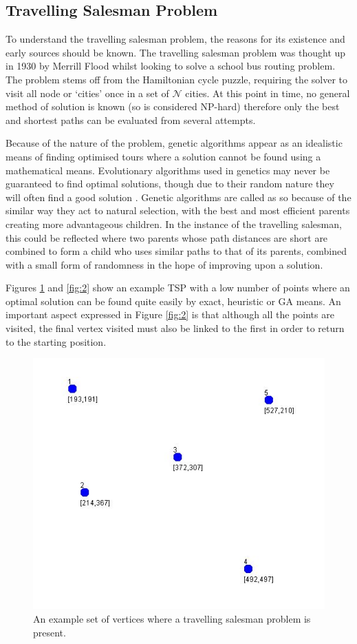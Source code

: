 \documentclass[article]{IEEEtran}
\begin{document}
\subsection{Travelling Salesman Problem}
To understand the travelling salesman problem, the reasons for its existence and early sources should be known. The travelling salesman problem was thought up in 1930 \cite{1} by Merrill Flood whilst looking to solve a school bus routing problem. The problem stems off from the Hamiltonian cycle puzzle, requiring the solver to visit all node or ‘cities’ once in a set of \( \mathcal{N} \) cities. At this point in time, no general method of solution is known \cite{2} (so is considered NP-hard) therefore only the best and shortest paths can be evaluated from several attempts. \par
Because of the nature of the problem, genetic algorithms appear as an idealistic means of finding optimised tours where a solution cannot be found using a mathematical means. Evolutionary algorithms used in genetics may never be guaranteed to find optimal solutions, though due to their random nature they will often find a good solution \cite{3}. Genetic algorithms are called as so because of the similar way they act to natural selection, with the best and most efficient parents creating more advantageous children. In the instance of the travelling salesman, this could be reflected where two parents whose path distances are short are combined to form a child who uses similar paths to that of its parents, combined with a small form of randomness in the hope of improving upon a solution. \par
Figures \ref{fig:1} and \ref{fig:2} show an example TSP with a low number of points where an optimal solution can be found quite easily by exact, heuristic or GA means. An important aspect expressed in Figure \ref{fig:2} is that although all the points are visited, the final vertex visited must also be linked to the first in order to return to the starting position.
\begin{figure}
\centering
  \includegraphics[width=.8\linewidth]{images/problem}
  \caption{An example set of vertices where a travelling salesman problem is present.}
  \label{fig:1}
\end{figure}
\end{document}
